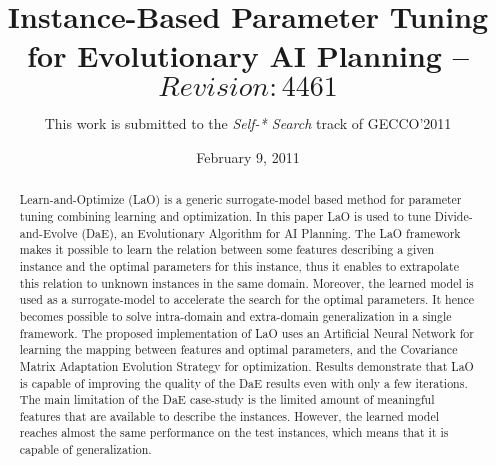 \documentclass{acm_proc_article-sp}
\begin{document}
\title{Instance-Based Parameter Tuning\\
for Evolutionary AI Planning -- $Revision: 4461$}


\author{This work is submitted to the {\large \em Self-* Search} track of GECCO'2011}

% 

\date{February 9, 2011}
\maketitle
\begin{abstract}
\noindent Learn-and-Optimize (LaO) is a generic surrogate-model based method for parameter tuning combining learning and optimization. In this paper LaO is used to tune Divide-and-Evolve (DaE), an Evolutionary Algorithm for AI Planning. The LaO framework makes it possible to learn the relation between some features describing a given instance and the optimal parameters for this instance, thus it enables to extrapolate this relation to unknown instances in the same domain. Moreover, the learned model is used as a surrogate-model to accelerate the search for the optimal parameters. It hence becomes possible to solve intra-domain and extra-domain generalization in a single framework. The proposed implementation of LaO uses an Artificial Neural Network for learning the mapping between features and optimal parameters, and the Covariance Matrix Adaptation Evolution Strategy for optimization. Results demonstrate that LaO is capable of improving the quality of the DaE results even with only a few iterations. The main limitation of the DaE case-study is the limited amount of meaningful features that are available to describe the instances. However, the learned model reaches almost the same performance on the test instances, which means that it is capable of generalization. 

\end{abstract}
\end{document}
